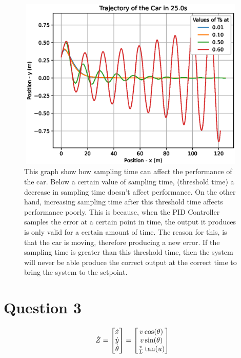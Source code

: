 \documentclass[10pt]{article}
\begin{document}
\begin{figure}
\centering
\includegraphics[width=11cm, height=8.25cm]{q2_4_trajectory.eps}
\caption
{This graph show how sampling time can affect the performance of the car. Below a certain value of sampling time, (threshold time) a decrease in sampling time doesn’t affect performance. On the other hand, increasing sampling time after this threshold time affects performance poorly. 
This is because, when the PID Controller samples the error at a certain point in time, the output it produces is only valid for a certain amount of time. The reason for this, is that the car is moving, therefore producing a new error. If the sampling time is greater than this threshold time, then the system will never be able produce the correct output at the correct time to bring the system to the setpoint.
}
\end{figure}

\section{Question 3}

\begin{equation*}
\dot{Z} = 
\begin{bmatrix}
\dot{x}\cr
\dot{y}\cr
\dot{\theta}\cr
\end{bmatrix}
=
\begin{bmatrix}
v\cos(\theta)\cr
v\sin(\theta)\cr
\frac{v}{L}\tan(u)\cr
\end{bmatrix}
\end{equation*}
\end{document}
